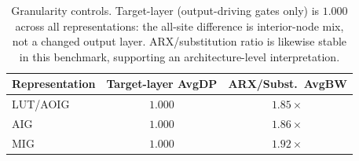 \begin{table}[t]
\centering
\caption{Granularity controls. Target-layer \AvgDP{} (output-driving gates only) is $1.000$ across all representations: the all-site difference is interior-node mix, not a changed output layer. ARX/substitution \AvgBW{} ratio is likewise stable in this benchmark, supporting an architecture-level interpretation.}
\label{tab:representation_robustness}
\begin{tabular}{lcc}
\toprule
Representation & Target-layer AvgDP & ARX/Subst.\ AvgBW \\
\midrule
LUT/AOIG & $1.000$ & $1.85\times$ \\
AIG & $1.000$ & $1.86\times$ \\
MIG & $1.000$ & $1.92\times$ \\
\bottomrule
\end{tabular}
\end{table}
